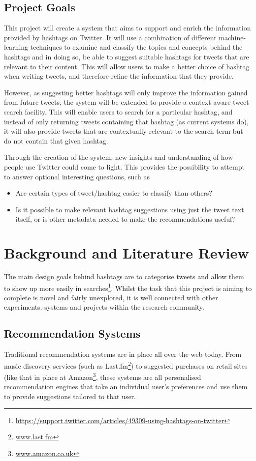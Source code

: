 \documentclass[12pt,a4paper]{article}
\begin{document}
\subsection{Project Goals}
\label{sec:goals}
This project will create a system that aims to support and enrich the information provided by hashtags on Twitter. It will use a combination of different machine-learning techniques to examine and classify the topics and concepts behind the hashtags and in doing so, be able to suggest suitable hashtags for tweets that are relevant to their content. This will allow users to make a better choice of hashtag when writing tweets, and therefore refine the information that they provide.

However, as suggesting better hashtags will only improve the information gained from future tweets, the system will be extended to provide a context-aware tweet search facility. This will enable users to search for a particular hashtag, and instead of only returning tweets containing that hashtag (as current systems do), it will also provide tweets that are contextually relevant to the search term but do not contain that given hashtag.

Through the creation of the system, new insights and understanding of how people use Twitter could come to light. This provides the possibility to attempt to answer optional interesting questions, such as
\begin{itemize}
    \item Are certain types of tweet/hashtag easier to classify than others?
    \item Is it possible to make relevant hashtag suggestions using just the tweet text itself, or is other metadata needed to make the recommendations useful?
\end{itemize}

\pagebreak

\section{Background and Literature Review}
\label{sec:litreview}
The main design goals behind hashtags are to categorise tweets and allow them to show up more easily in searches\footnote{\url{https://support.twitter.com/articles/49309-using-hashtags-on-twitter}}. Whilst the task that this project is aiming to complete is novel and fairly unexplored, it is well connected with other experiments, systems and projects within the research community.

\subsection{Recommendation Systems}
Traditional recommendation systems are in place all over the web today. From music discovery services (such as Last.fm\footnote{\url{www.last.fm}}) to suggested purchases on retail sites (like that in place at Amazon\footnote{\url{www.amazon.co.uk}}, these systems are all personalised recommendation engines that take an individual user's preferences and use them to provide suggestions tailored to that user.
\end{document}
